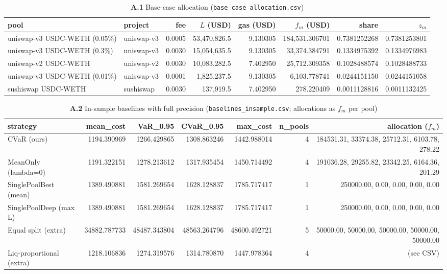 \documentclass[11pt,a4paper]{article}
\theoremstyle{remark}
\newcommand{\code}[1]{\texttt{#1}}
\begin{document}
\begin{landscape}
\begin{table}[H]
\centering
\caption*{\textbf{A.1} Base-case allocation (\code{base\_case\_allocation.csv})}
\scriptsize
\begin{tabular}{@{}llrrrrrr@{}}
\toprule
pool & project & fee & $L$ (USD) & gas (USD) & $f_m$ (USD) & share & $z_m$ \\
\midrule
uniswap-v3 USDC-WETH (0.05\%) & uniswap-v3 & 0.0005 & 53{,}470{,}826.5 & 9.130305 &
184{,}531.306701 & 0.7381252268 & 0.7381253801 \\
uniswap-v3 USDC-WETH (0.3\%) & uniswap-v3 & 0.0030 & 15{,}054{,}635.5 & 9.130305 &
33{,}374.384791 & 0.1334975392 & 0.1334976983 \\
uniswap-v2 USDC-WETH & uniswap-v2 & 0.0030 & 10{,}083{,}282.5 & 7.402950 &
25{,}712.309358 & 0.1028488574 & 0.1028488733 \\
uniswap-v3 USDC-WETH (0.01\%) & uniswap-v3 & 0.0001 & 1{,}825{,}237.5 & 9.130305 &
6{,}103.778741 & 0.0244151150 & 0.0244151058 \\
sushiswap USDC-WETH & sushiswap & 0.0030 & 137{,}919.5 & 7.402950 &
278.220409 & 0.0011128816 & 0.0011132425 \\
\bottomrule
\end{tabular}
\end{table}

\begin{table}[H]
\centering
\caption*{\textbf{A.2} In-sample baselines with full precision
(\code{baselines\_insample.csv}; allocations as $f_m$ per pool)}
\scriptsize
\begin{tabular}{@{}lrrrrrr@{}}
\toprule
strategy & mean\_cost & VaR\_0.95 & CVaR\_0.95 & max\_cost & n\_pools & allocation ($f_m$) \\
\midrule
CVaR (ours) & 1194.390969 & 1266.429865 & 1308.863246 & 1442.988014 & 4 &
184531.31, 33374.38, 25712.31, 6103.78, 278.22 \\
MeanOnly (lambda=0) & 1191.322151 & 1278.213612 & 1317.935454 & 1450.714492 & 4 &
191036.28, 29255.82, 23342.25, 6164.36, 201.29 \\
SinglePoolBest (mean) & 1389.490881 & 1581.269654 & 1628.128837 & 1785.717417 & 1 &
250000.00, 0.00, 0.00, 0.00, 0.00 \\
SinglePoolDeep (max L) & 1389.490881 & 1581.269654 & 1628.128837 & 1785.717417 & 1 &
250000.00, 0.00, 0.00, 0.00, 0.00 \\
Equal split (extra) & 34882.787733 & 48487.343804 & 48563.264796 & 48600.492721 & 5 &
50000.00, 50000.00, 50000.00, 50000.00, 50000.00 \\
Liq-proportional (extra) & 1218.106836 & 1274.319576 & 1314.780870 & 1447.978364 & 4 &
(see CSV) \\
\bottomrule
\end{tabular}
\end{table}


\end{landscape}
\end{document}
